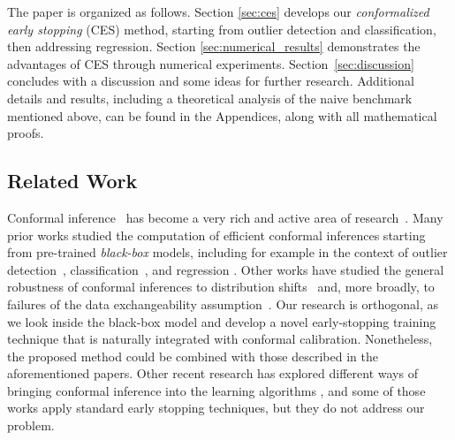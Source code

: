 The paper is organized as follows. Section \ref{sec:ces} develops our {\em conformalized early stopping} (CES) method, starting from outlier detection and classification, then addressing regression. Section \ref{sec:numerical_results} demonstrates the advantages of CES through numerical experiments. Section~\ref{sec:discussion} concludes with a discussion and some ideas for further research.
Additional details and results, including a theoretical analysis of the naive benchmark mentioned above, can be found in the Appendices, along with all mathematical proofs.

\subsection*{Related Work}

Conformal inference~\citep{saunders1999transduction,vovk1999machine,vovk2005algorithmic} has become a very rich and active area of research~\cite{lei2013distribution,lei2014distribution,lei2018distribution,barber2019predictive}.
Many prior works studied the computation of efficient conformal inferences starting from pre-trained {\em black-box} models, including for example in the context of outlier detection~\cite{smith2015conformal,guan2019prediction,Liang_2022_integrative_p_val,bates2021testing}, classification~\cite{vovk2003mondrian,hechtlinger2018cautious,romano2020classification,angelopoulos2020uncertainty,bates2021distributionfree}, and regression \cite{vovk2005algorithmic,lei2014distribution,romano2019conformalized}.
Other works have studied the general robustness of conformal inferences to distribution shifts~\cite{tibshirani2019conformal,sesia2022conformal} and, more broadly, to failures of the data exchangeability assumption~\cite{barber2022conformal,gibbs2022conformal}.
Our research is orthogonal, as we look inside the black-box model and develop a novel early-stopping training technique that is naturally integrated with conformal calibration. Nonetheless, the proposed method could be combined with those described in the aforementioned papers.
Other recent research has explored different ways of bringing conformal inference into the learning algorithms \cite{colombo2020training,bellotti2021optimized,stutz2021learning,einbinder2022training}, and some of those works apply standard early stopping techniques, but they do not address our problem.

